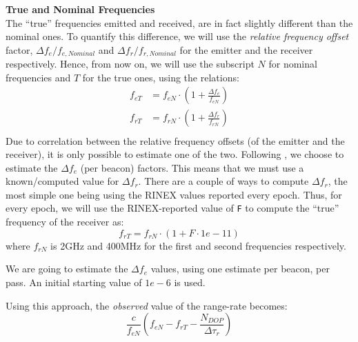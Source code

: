 \textbf{True and Nominal Frequencies}\\
\label{true-nominal-frequencies}
The ``true'' frequencies emitted and received, are in fact slightly different 
than the nominal ones. To quantify this difference, we will use the 
\emph{relative frequency offset} factor, $\Delta f_e / f_{e,Nominal}$ and 
$\Delta f_r / f_{r,Nominal}$ for the emitter and the receiver respectively. 
Hence, from now on, we will use the subscript $N$ for nominal frequencies and 
$T$ for the true ones, using the relations:
\begin{equation}
  \begin{aligned}
    f_{eT} &= f_{eN} \cdot \left( 1 + \frac{\Delta f_e}{f_{eN}} \right) \\
    f_{rT} &= f_{rN} \cdot \left( 1 + \frac{\Delta f_r}{f_{rN}} \right) \\
  \end{aligned}
\end{equation}
Due to correlation between the relative frequency offsets (of the emitter and 
the receiver), it is only possible to estimate one of the two. Following \cite{lemoine-2016}, 
we choose to estimate the $\Delta f_e$ (per beacon) factors. This means that we 
must use a known/computed value for $\Delta f_r$. {\color{brown}There are a couple 
of ways to compute $\Delta f_r$, the most simple one being using the RINEX values 
reported every epoch.}
Thus, for every epoch, we will use the RINEX-reported value of \texttt{F} to 
compute the ``true'' frequency of the receiver as:
\begin{equation}
  f_{rT} = f_{rN} \cdot \left( 1 + F \cdot 1e-11 \right)
\end{equation}
where $f_{rN}$ is 2GHz and 400MHz for the first and second frequencies 
respectively.

We are going to estimate the $\Delta f_e$ values, using one estimate per beacon, 
per pass. An initial starting value of $1e-6$ is used.

Using this approach, the \emph{observed} value of the range-rate becomes:
\begin{equation}
  \frac{c}{f_{eN}} \left( f_{eN} - f_{rT} - \frac{N_{DOP}}{\Delta \tau_{r}} \right) 
\end{equation}

